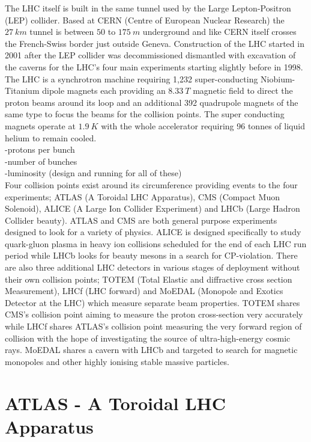 	The LHC itself is built in the same tunnel used by the Large Lepton-Positron (LEP) collider. Based at CERN (Centre of European Nuclear Research) the $27~km$ tunnel is between $50$ to $175~m$ underground and like CERN itself crosses the French-Swiss border just outside Geneva. Construction of the LHC started in 2001 after the LEP collider was decommissioned dismantled with excavation of the caverns for the LHC's four main experiments starting slightly before in 1998. 
	The LHC is a synchrotron machine requiring 1,232 super-conducting Niobium-Titanium dipole magnets each providing an $8.33~T$ magnetic field to direct the proton beams around its loop and an additional 392 quadrupole magnets of the same type to focus the beams for the collision points. The super conducting magnets operate at $1.9~K$ with the whole accelerator requiring 96 tonnes of liquid helium to remain cooled.\\

	-protons per bunch\\
	-number of bunches\\
	-luminosity (design and running for all of these)\\

	Four collision points exist around its circumference providing events to the four experiments; ATLAS (A Toroidal LHC Apparatus), CMS (Compact Muon Solenoid), ALICE (A Large Ion Collider Experiment) and LHCb (Large Hadron Collider beauty). ATLAS and CMS are both general purpose experiments designed to look for a variety of physics. ALICE is designed specifically to study quark-gluon plasma in heavy ion collisions scheduled for the end of each LHC run period while LHCb looks for beauty mesons in a search for CP-violation.
	There are also three additional LHC detectors in various stages of deployment without their own collision points; TOTEM (Total Elastic and diffractive cross section Measurement), LHCf (LHC forward) and MoEDAL (Monopole and Exotics Detector at the LHC) which measure separate beam properties. TOTEM shares CMS's collision point aiming to measure the proton cross-section very accurately while LHCf shares ATLAS's collision point measuring the very forward region of collision with the hope of investigating the source of ultra-high-energy cosmic rays. MoEDAL shares a cavern with LHCb and targeted to search for magnetic monopoles and other highly ionising stable massive particles.


\newpage

\section{ATLAS - A Toroidal LHC Apparatus}

